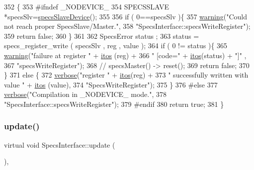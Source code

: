 \begin{DoxyCode}
352                                                            \{
353 \textcolor{preprocessor}{#ifndef \_NODEVICE\_
}
354   SPECSSLAVE *specsSlv=\hyperlink{classSpecsInterface_ac8d4711197f484f055533ec1e5ae01a1}{specsSlaveDevice}();
355 
356   \textcolor{keywordflow}{if} ( 0==specsSlv  )\{
357     \hyperlink{classObject_a65cd4fda577711660821fd2cd5a3b4c9}{warning}(\textcolor{stringliteral}{"Could not reach proper SpecsSlave/Master."},
358             \textcolor{stringliteral}{"SpecsInterface::specsWriteRegister"});
359     \textcolor{keywordflow}{return} \textcolor{keyword}{false};
360   \}
361   
362   SpecsError status ;
363   status = specs\_register\_write ( specsSlv , reg , value ); 
364   \textcolor{keywordflow}{if} ( 0 != status )\{
365     \hyperlink{classObject_a65cd4fda577711660821fd2cd5a3b4c9}{warning}(\textcolor{stringliteral}{"failure at register "} + \hyperlink{Tools_8h_af330027dbdafb9a30768b3613c553e60}{itos} (reg) +
366             \textcolor{stringliteral}{" [code="} + \hyperlink{Tools_8h_af330027dbdafb9a30768b3613c553e60}{itos}(status) + \textcolor{stringliteral}{"]"} ,
367             \textcolor{stringliteral}{"specsWriteRegister"});
368     \textcolor{comment}{//    specsMaster() -> reset();}
369     \textcolor{keywordflow}{return} \textcolor{keyword}{false};
370   \}
371   \textcolor{keywordflow}{else} \{
372     \hyperlink{classObject_a83d2db2df682907ea1115ad721c1c4a1}{verbose}(\textcolor{stringliteral}{"register "} + \hyperlink{Tools_8h_af330027dbdafb9a30768b3613c553e60}{itos}(reg) +
373             \textcolor{stringliteral}{" successfully written with value "} + \hyperlink{Tools_8h_af330027dbdafb9a30768b3613c553e60}{itos} (value),
374             \textcolor{stringliteral}{"SpecsWriteRegister"});
375   \}
376 \textcolor{preprocessor}{#else
}
377   \hyperlink{classObject_a83d2db2df682907ea1115ad721c1c4a1}{verbose}(\textcolor{stringliteral}{"Compilation in \_NODEVICE\_ mode."},
378           \textcolor{stringliteral}{"SpecsInterface::specsWriteRegister"});
379 \textcolor{preprocessor}{#endif
}
380   \textcolor{keywordflow}{return} \textcolor{keyword}{true};
381 \}
\end{DoxyCode}
\mbox{\label{classSpecsInterface_af17ca5c8d48bea81f84e503b2994f5da}} 
\subsubsection{\texorpdfstring{update()}{update()}}
{\footnotesize\ttfamily virtual void Specs\+Interface\+::update (\begin{DoxyParamCaption}{ }\end{DoxyParamCaption})\hspace{0.3cm}{\ttfamily [inline]}, {\ttfamily [virtual]}}

